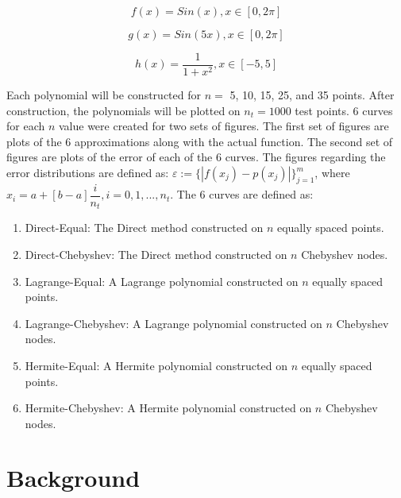 \documentclass[11pt]{article}%
\begin{document}
\begin{equation}
f\left(x\right) = Sin(x), x \in [0, 2\pi]
\end{equation}

\begin{equation}
g\left(x\right) = Sin(5x), x \in [0, 2\pi]
\end{equation}

\begin{equation}
h\left(x\right) = \dfrac{1}{1+x^2}, x \in [-5, 5]
\end{equation}

Each polynomial will be constructed for $ n = $ 5, 10, 15, 25, and 35 points. After construction, the polynomials will be plotted on $ n_t = 1000 $ test points. 6 curves for each $n$ value were created for two sets of figures. The first set of figures are plots of the 6 approximations along with the actual function. The second set of figures are plots of the error of each of the 6 curves. The figures regarding the error distributions are defined as: $\varepsilon:=\{|f(x_j) - p(x_j)|\}^m_{j=1}$, where $x_i = a + [b - a]\dfrac{i}{n_t}, i = 0, 1, ..., n_t$. The 6 curves are defined as:
\begin{enumerate}
\item Direct-Equal: The Direct method constructed on $n$ equally spaced points.
\item Direct-Chebyshev: The Direct method constructed on $n$ Chebyshev nodes.
\item Lagrange-Equal: A Lagrange polynomial constructed on $n$ equally spaced points.
\item Lagrange-Chebyshev: A Lagrange polynomial constructed on $n$ Chebyshev nodes.
\item Hermite-Equal: A Hermite polynomial constructed on $n$ equally spaced points.
\item Hermite-Chebyshev: A Hermite polynomial constructed on $n$ Chebyshev nodes.
\end{enumerate}

\newpage
\section*{Background}
\end{document}
